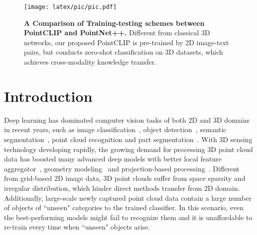 \documentclass[10pt,twocolumn,letterpaper]{article}
\begin{document}
\begin{figure}[t]
  \centering
\texttt{[image: latex/pic/pic.pdf]}
   \caption{\textbf{A Comparison of Training-testing schemes between PointCLIP and PointNet++.} Different from classical 3D networks, our proposed PointCLIP is pre-trained by 2D image-text pairs, but conducts zero-shot classification on 3D datasets, which achieves cross-modality knowledge transfer.}
    \label{fig:simple_intro}
    \vspace{-0.5cm}
\end{figure}

\vspace{-15pt}
\section{Introduction}
\label{sec:intro}

Deep learning has dominated computer vision tasks of both 2D and 3D domains in recent years, such as image classification~\cite{he2016deep,dosovitskiy2021vit,mao2021dual,krizhevsky2012imagenet,parmar2018image,gao2021container}, object detection~\cite{ren2015faster,carion2020end,zheng2020end,lang2019pointpillars, engelcke2017vote3deep, chen2017multi}, semantic segmentation~\cite{zheng2021rethinking,zhang2018context,long2015fully,chen2017deeplab,huang2019ccnet}, point cloud recognition and part segmentation~\cite{qi2017pointnet,qi2017pointnet++,wang2019dynamic,goyal2021revisiting}. With 3D sensing technology developing rapidly, the growing demand for processing 3D point cloud data has boosted many advanced deep models with better local feature aggregator~\cite{li2018pointcnn,thomas2019kpconv,liu2019meteornet}, geometry modeling~\cite{guo2021pct,muzahid2020curvenet,pan20183dti} and projection-based processing~\cite{su2015multi,liu2019point,guo2021pct}. Different from grid-based 2D image data, 3D point clouds suffer from space sparsity and irregular distribution, which hinder direct methods transfer from 2D domain. Additionally, large-scale newly captured point cloud data contain a large number of objects of ``unseen" categories to the trained classifier. In this scenario, even the best-performing models might fail to recognize them and it is unaffordable to re-train every time when ``unseen" objects arise. 
\end{document}

